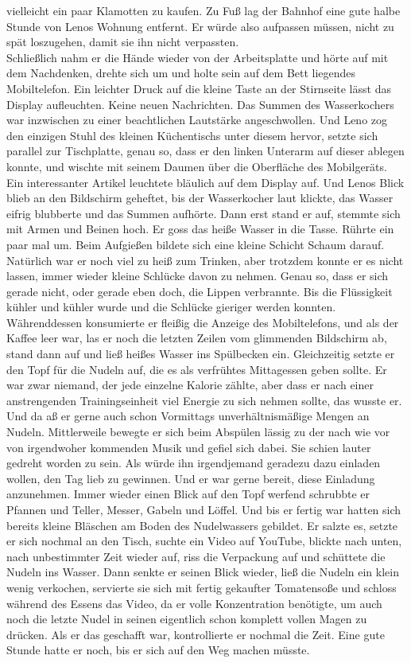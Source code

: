 \documentclass[ngerman,smalldemyvopaper,11pt,oneside,onecolumn,openright,extrafontsizes]{memoir}
\begin{document}
vielleicht ein paar Klamotten zu kaufen. Zu Fuß lag der Bahnhof eine gute halbe Stunde von Lenos Wohnung entfernt. Er würde also aufpassen müssen, nicht zu spät loszugehen, damit sie ihn nicht verpassten.
\vspace{0.5em} \\
Schließlich nahm er die Hände wieder von der Arbeitsplatte und hörte auf mit dem Nachdenken, drehte sich um und holte sein auf dem Bett liegendes Mobiltelefon. Ein leichter Druck auf die kleine Taste an der Stirnseite lässt das Display aufleuchten. Keine neuen Nachrichten. Das Summen des Wasserkochers war inzwischen zu einer beachtlichen Lautstärke angeschwollen. Und Leno zog den einzigen Stuhl des kleinen Küchentischs unter diesem hervor, setzte sich parallel zur Tischplatte, genau so, dass er den linken Unterarm auf dieser ablegen konnte, und wischte mit seinem Daumen über die Oberfläche des Mobilgeräts. Ein interessanter Artikel leuchtete bläulich auf dem Display auf. Und Lenos Blick blieb an den Bildschirm geheftet, bis der Wasserkocher laut klickte, das Wasser eifrig blubberte und das Summen aufhörte. Dann erst stand er auf, stemmte sich mit Armen und Beinen hoch. Er goss das heiße Wasser in die Tasse. Rührte ein paar mal um. Beim Aufgießen bildete sich eine kleine Schicht Schaum darauf. Natürlich war er noch viel zu heiß zum Trinken, aber trotzdem konnte er es nicht lassen, immer wieder kleine Schlücke davon zu nehmen. Genau so, dass er sich gerade nicht, oder gerade eben doch, die Lippen verbrannte. Bis die Flüssigkeit kühler und kühler wurde und die Schlücke gieriger werden konnten. Währenddessen konsumierte er fleißig die Anzeige des Mobiltelefons, und als der Kaffee leer war, las er noch die letzten Zeilen vom glimmenden Bildschirm ab, stand dann auf und ließ heißes Wasser ins Spülbecken ein. Gleichzeitig setzte er den Topf für die Nudeln auf, die es als verfrühtes Mittagessen geben sollte. Er war zwar niemand, der jede einzelne Kalorie zählte, aber dass er nach einer anstrengenden Trainingseinheit viel Energie zu sich nehmen sollte, das wusste er. Und da aß er gerne auch schon Vormittags unverhältnismäßige Mengen an Nudeln. Mittlerweile bewegte er sich beim Abspülen lässig zu der nach wie vor von irgendwoher kommenden Musik und gefiel sich dabei. Sie schien lauter gedreht worden zu sein. Als würde ihn irgendjemand geradezu dazu einladen wollen, den Tag lieb zu gewinnen. Und er war gerne bereit, diese Einladung anzunehmen. Immer wieder einen Blick auf den Topf werfend schrubbte er Pfannen und Teller, Messer, Gabeln und Löffel. Und bis er fertig war hatten sich bereits kleine Bläschen am Boden des Nudelwassers gebildet. Er salzte es, setzte er sich nochmal an den Tisch, suchte ein Video auf YouTube, blickte nach unten, nach unbestimmter Zeit wieder auf, riss die Verpackung auf und schüttete die Nudeln ins Wasser. Dann senkte er seinen Blick wieder, ließ die Nudeln ein klein wenig verkochen, servierte sie sich mit fertig gekaufter Tomatensoße und schloss während des Essens das Video, da er volle Konzentration benötigte, um auch noch die letzte Nudel in seinen eigentlich schon komplett vollen Magen zu drücken. Als er das geschafft war, kontrollierte er nochmal die Zeit. Eine gute Stunde hatte er noch, bis er sich auf den Weg machen müsste.
\end{document}
